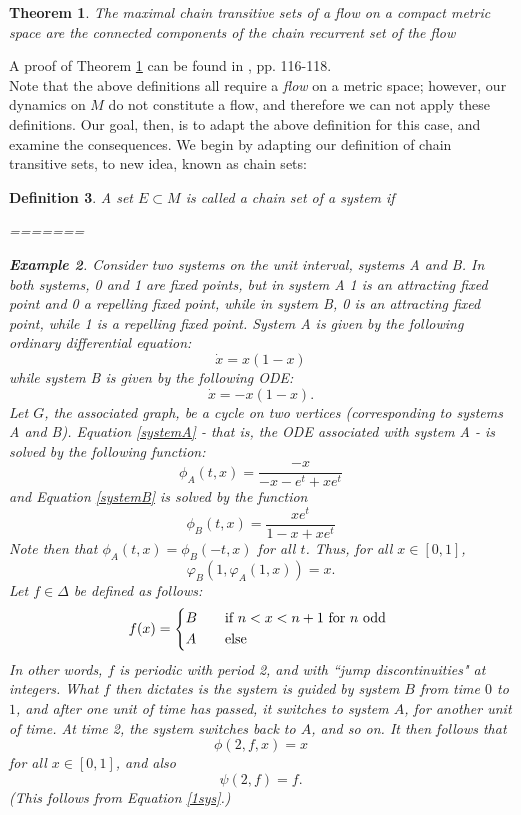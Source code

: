 \documentclass[11pt]{article}
\newtheorem{thm}{Theorem}
\newtheorem{defn}[thm]{Definition}
\newtheorem{ex}[thm]{Example}
\begin{document}
\begin{thm}\label{chaincom}
The maximal chain transitive sets of a flow on a compact metric space are the connected components of the chain recurrent set of the flow
\end{thm}
\noindent A proof of Theorem \ref{chaincom} can be found in \cite{Alongi}, pp. 116-118.\\

\indent Note that the above definitions all require a \emph{flow} on a metric space; however, our dynamics on $M$ do not constitute a flow, and therefore we can not apply these definitions.  Our goal, then, is to adapt the above definition for this case, and examine the consequences.  We begin by adapting our definition of chain transitive sets, to new idea, known as chain sets:


\begin{defn} \label{chain set} A set $E\subset M$ is called a chain set of a system if 

=======
\begin{ex}
Consider two systems on the unit interval, systems A and B.  In both systems, 0 and 1 are fixed points, but in system A 1 is an attracting fixed point and 0 a repelling fixed point, while in system B, 0 is an attracting fixed point, while 1 is a repelling fixed point.  System A is given by the following ordinary differential equation:
\begin{equation}\label{systemA}\dot{x}=x(1-x)\end{equation}
while system B is given by the following ODE:
\begin{equation}\label{systemB}\dot{x}=-x(1-x).\end{equation}
Let $G$, the associated graph, be a cycle on two vertices (corresponding to systems A and B).  Equation \ref{systemA} - that is, the ODE associated with system A - is solved by the following function:
$$\phi_A(t,x)=\frac{-x}{-x-e^t+xe^t}$$
and Equation \ref{systemB} is solved by the function
$$\phi_B(t,x)=\frac{xe^t}{1-x+xe^t}$$
Note then that $\phi_A(t,x)=\phi_B(-t,x)$ for all $t$.  Thus, for all $x\in[0,1]$, 
\begin{equation}\label{1sys}\varphi_B(1,\varphi_A(1,x))=x.\end{equation}
Let $f\in\Delta$ be defined as follows:
\[ f(x) =
  \begin{cases*}
    B \quad& if $ n<x<n+1$ for $n$ odd \\
    A & else \\
  \end{cases*}\]
In other words, $f$ is periodic with period 2, and with ``jump discontinuities" at integers.   What $f$ then dictates is the system is guided by system $B$ from time $0$ to $1$, and after one unit of time has passed, it switches to system $A$, for another unit of time.  At time 2, the system switches back to $A$, and so on.  It then follows that
$$\phi(2,f,x)=x$$
for all $x\in[0,1]$, and also
$$\psi(2,f)=f.$$
(This follows from Equation \ref{1sys}.)   \\


\end{ex}
\end{defn}
\end{document}
